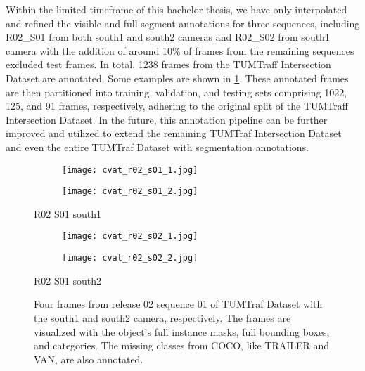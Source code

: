 Within the limited timeframe of this bachelor thesis, we have only interpolated and refined the visible and full segment annotations for three sequences, including R02\_S01 from both south1 and south2 cameras and R02\_S02 from south1 camera with the addition of around 10\% of frames from the remaining sequences excluded test frames. In total, 1238 frames from the TUMTraff Intersection Dataset are annotated. Some examples are shown in \cref{figure:cvat_annotated_example}. These annotated frames are then partitioned into training, validation, and testing sets comprising 1022, 125, and 91 frames, respectively, adhering to the original split of the TUMTraff Intersection Dataset. In the future, this annotation pipeline can be further improved and utilized to extend the remaining TUMTraf Intersection Dataset and even the entire TUMTraf Dataset with segmentation annotations. 

\begin{figure}[htb]  
	\centering
	\begin{subfigure}{0.48\textwidth}
		\texttt{[image: cvat\_r02\_s01\_1.jpg]}
		\vspace{-\baselineskip} %
	\end{subfigure}
	\begin{subfigure}{0.48\textwidth}
		\texttt{[image: cvat\_r02\_s01\_2.jpg]}
		\vspace{-\baselineskip} %
	\end{subfigure}
	\vspace{-0.6em}
	\caption*{R02 S01 south1}
	
	
	\begin{subfigure}{0.48\textwidth}
		\texttt{[image: cvat\_r02\_s02\_1.jpg]}
		\vspace{-\baselineskip} %
	\end{subfigure}
	\begin{subfigure}{0.48\textwidth}
		\texttt{[image: cvat\_r02\_s02\_2.jpg]}
		\vspace{-\baselineskip} %
	\end{subfigure}
	\vspace{-0.6em}
	\caption*{R02 S01 south2}
	
	\caption{Four frames from release 02 sequence 01 of TUMTraf Dataset with the south1 and south2 camera, respectively. The frames are visualized with the object's full instance masks, full bounding boxes, and categories. The missing classes from COCO, like TRAILER and VAN, are also annotated.}
	\label{figure:cvat_annotated_example}
\end{figure}



